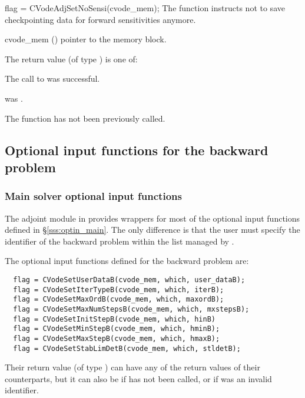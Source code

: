 {
  flag = CVodeAdjSetNoSensi(cvode\_mem);
}
{
  The function  instructs  not
  to save checkpointing data for forward sensitivities anymore.
}
{
  \begin{args}
  \item[cvode\_mem] ()
    pointer to the {\cvodes}  memory block.
  \end{args}
}
{
  The return value  (of type ) is one of:
  \begin{args}
  \item[\Id{CV\_SUCCESS}]
    The call to  was successful.
  \item[\Id{CV\_MEM\_NULL}]
     was .
  \item[\Id{CV\_NO\_ADJ}]
    The function  has not been previously called.
  \end{args}
}
{}


\subsection{Optional input functions for the backward problem}
\label{ss:optional_input_b}
\subsubsection{Main solver optional input functions}

The adjoint module in {\cvodes} provides wrappers for most of the optional 
input functions defined in \S\ref{sss:optin_main}. The only difference is 
that the user must specify the identifier  of the backward problem 
within the list managed by {\cvodes}. 

The optional input functions defined for the backward problem are:
\begin{verbatim}
  flag = CVodeSetUserDataB(cvode_mem, which, user_dataB);
  flag = CVodeSetIterTypeB(cvode_mem, which, iterB);
  flag = CVodeSetMaxOrdB(cvode_mem, which, maxordB);
  flag = CVodeSetMaxNumStepsB(cvode_mem, which, mxstepsB);
  flag = CVodeSetInitStepB(cvode_mem, which, hinB)
  flag = CVodeSetMinStepB(cvode_mem, which, hminB);
  flag = CVodeSetMaxStepB(cvode_mem, which, hmaxB);
  flag = CVodeSetStabLimDetB(cvode_mem, which, stldetB);
\end{verbatim}
Their return value  (of type ) can have any of the return values 
of their counterparts, but it can also be  if  
has not been called, or  if  was an invalid identifier. 

